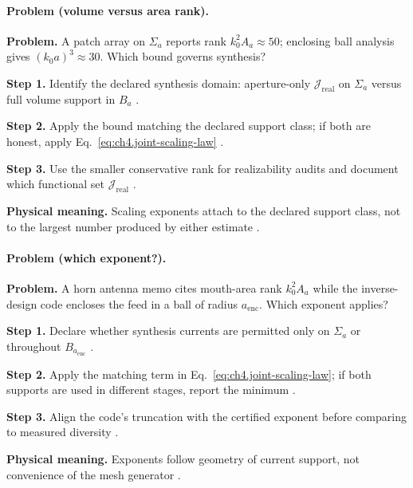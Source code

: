 \paragraph{Problem (volume versus area rank).}
\textbf{Problem.} A patch array on \(\Sigma_{a}\) reports rank \(k_{0}^{2}A_{a}\approx50\); enclosing ball analysis gives
\((k_{0}a)^{3}\approx30\). Which bound governs synthesis?

\textbf{Step 1.} Identify the declared synthesis domain: aperture-only \(\mathcal{J}_{\mathrm{real}}\) on \(\Sigma_{a}\) versus full
volume support in \(B_{a}\) \cite{collin2001,stratton1941,harrington2001}.

\textbf{Step 2.} Apply the bound matching the declared support class; if both are honest, apply Eq.~\eqref{eq:ch4.joint-scaling-law}
\cite{devaney2004,hansen1988,jackson1999}.

\textbf{Step 3.} Use the smaller conservative rank for realizability audits and document which functional set \(\mathcal{J}_{\mathrm{real}}\)
\cite{stratton1941,harrington2001}.

\textbf{Physical meaning.} Scaling exponents attach to the declared support class, not to the largest number produced by either estimate
\cite{hansen1988,collin2001}.

\paragraph{Problem (which exponent?).}
\textbf{Problem.} A horn antenna memo cites mouth-area rank \(k_{0}^{2}A_{a}\) while the inverse-design code encloses the feed in a ball
of radius \(a_{\mathrm{enc}}\). Which exponent applies?

\textbf{Step 1.} Declare whether synthesis currents are permitted only on \(\Sigma_{a}\) or throughout \(B_{a_{\mathrm{enc}}}\)
\cite{collin2001,stratton1941}.

\textbf{Step 2.} Apply the matching term in Eq.~\eqref{eq:ch4.joint-scaling-law}; if both supports are used in different stages, report
the minimum \cite{harrington2001,devaney2004,hansen1988}.

\textbf{Step 3.} Align the code's truncation with the certified exponent before comparing to measured diversity \cite{jackson1999,stratton1941}.

\textbf{Physical meaning.} Exponents follow geometry of current support, not convenience of the mesh generator \cite{hansen1988,harrington2001}.

